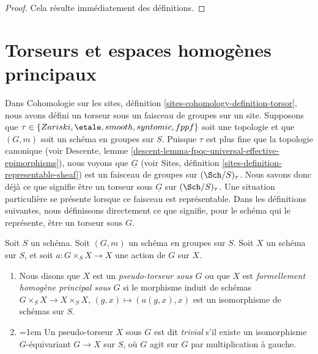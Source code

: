 \begin{proof}
Cela résulte immédiatement des définitions.
\end{proof}






\section{Torseurs et espaces homogènes principaux}
\label{section-principal-homogeneous}

\noindent
Dans
Cohomologie sur les sites, définition \ref{sites-cohomology-definition-torsor},
nous avons défini un torseur sous un faisceau de groupes sur un site.
Supposons que $\tau \in\allowbreak \{Zariski,\allowbreak \etale,\allowbreak smooth,\allowbreak syntomic,\allowbreak fppf\}$ soit une
topologie et que $(G, m)$ soit un schéma en groupes sur $S$. Puisque $\tau$ est plus fine que
la topologie canonique (voir
Descente, lemme \ref{descent-lemma-fpqc-universal-effective-epimorphisms}),
nous voyons que $\underline{G}$ (voir
Sites, définition \ref{sites-definition-representable-sheaf})
est un faisceau de groupes sur $(\Sch/S)_\tau$.
Nous savons donc déjà ce que signifie être un
torseur sous $\underline{G}$ sur $(\Sch/S)_\tau$. Une situation particulière
se présente lorsque ce faisceau est représentable. Dans les définitions suivantes,
nous définissons directement ce que signifie, pour le schéma qui le représente, être un
torseur sous $G$.

\begin{definition}
\label{definition-pseudo-torsor}
Soit $S$ un schéma.
Soit $(G, m)$ un schéma en groupes sur $S$.
Soit $X$ un schéma sur $S$, et soit
$a : G \times_S X \to X$ une action de $G$ sur $X$.
\begin{enumerate}
\item Nous disons que $X$ est un {\it pseudo-torseur sous $G$} ou que $X$ est
{\it formellement homogène principal sous $G$} si le
morphisme induit de schémas $G \times_S X \to X \times_S X$,
$(g, x) \mapsto (a(g, x), x)$ est un isomorphisme de schémas sur $S$.
\item {\emergencystretch=1em Un pseudo-torseur $X$ sous $G$ est dit {\it trivial} s'il existe
un isomorphisme $G$-équivariant $G \to X$ sur $S$, où $G$ agit sur
$G$ par multiplication à gauche.\par}
\end{enumerate}
\end{definition}

